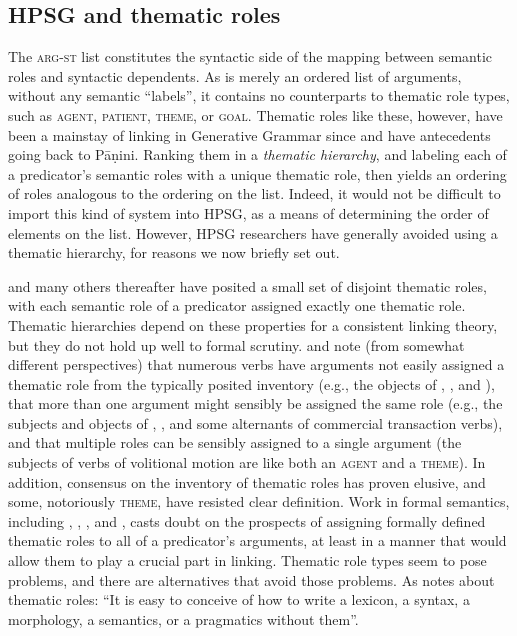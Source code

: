 \documentclass[output=paper
 	        ,biblatex
                ,babelshorthands
                ,newtxmath
                ,draftmode
                ,colorlinks, citecolor=brown
]{langscibook}
\begin{document}
\subsection{HPSG and thematic roles}
\label{thetaroles}


The \textsc{arg-st} list constitutes the syntactic side of the mapping between semantic roles and syntactic dependents.  As \argst is merely an ordered list of arguments, without any semantic ``labels'', it contains no counterparts to thematic role types, such as \textsc{agent}, \textsc{patient}, \textsc{theme}, or \textsc{goal}.  Thematic roles like these, however, have been a mainstay of linking in Generative Grammar since \citet{Fillmore1968} and have antecedents going back to P\={a}\d{n}ini.
Ranking them in a \emph{thematic hierarchy}, and labeling each of a predicator's semantic roles with a unique thematic role, then yields an ordering of roles analogous to the ordering on the \argst list.  Indeed, it would not be difficult to import this kind of system into HPSG, as a means of determining the order of elements on the \argst list.  However, HPSG researchers have generally avoided using a thematic hierarchy, for reasons we now briefly set out.

\citet{Fillmore1968} and many others thereafter have posited a small set of disjoint thematic roles,
with each semantic role of a predicator assigned exactly one thematic role.
Thematic hierarchies depend on these properties for a consistent linking theory, but they do not hold up well to formal scrutiny.
\citet{Jackendoff1987} and \citet{Dowty1991} note (from somewhat different perspectives) that
numerous verbs have arguments not easily assigned a thematic role from the typically posited
inventory (e.g., the objects of , , and ), that more than one
argument might sensibly be assigned the same role (e.g., the subjects and objects of
, , and some alternants of commercial transaction verbs), and that
multiple roles can be sensibly assigned to a single argument (the subjects of verbs of volitional
motion are like both an \textsc{agent} and a \textsc{theme}).
In addition, consensus on the inventory of thematic roles has proven elusive, and some, notoriously \textsc{theme}, have resisted clear definition.
Work in formal semantics, including \citet{LadusawandDowty1988}, \citet{Dowty1989}, \citet{Landman2000}, and \citet{Schein2002}, casts doubt on the prospects of assigning formally defined thematic roles to all of a predicator's arguments, at least in a manner that would allow them to play a crucial part in linking.
Thematic role types seem to pose problems, and there are alternatives that avoid those problems.  As \citet{Carlson1998} notes about thematic roles: ``It is easy to conceive of how to write a lexicon, a syntax, a morphology, a semantics, or a pragmatics without them''.
\end{document}
